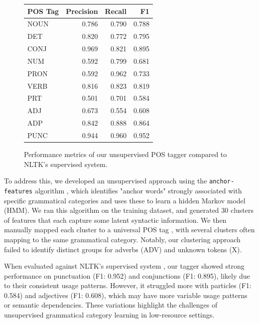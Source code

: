 \begin{figure}
    \centering
    \small
    \begin{tabular}{lrrr}
    \toprule
    POS Tag & Precision & Recall & F1 \\
    \midrule
    NOUN & 0.786 & 0.790 & 0.788 \\
    DET & 0.820 & 0.772 & 0.795 \\
    CONJ & 0.969 & 0.821 & 0.895 \\
    NUM & 0.592 & 0.799 & 0.681 \\
    PRON & 0.592 & 0.962 & 0.733 \\   
    VERB & 0.816 & 0.823 & 0.819 \\
    PRT & 0.501 & 0.701 & 0.584 \\
    ADJ & 0.673 & 0.554 & 0.608 \\
    ADP & 0.842 & 0.888 & 0.864 \\
    PUNC & 0.944 & 0.960 & 0.952 \\
    \bottomrule
    \end{tabular}
    \caption{\label{tbl:unsupervised-pos-performance} Performance metrics of our unsupervised POS tagger compared to NLTK's supervised system.}
\end{figure}

To address this, we developed an unsupervised approach using the \texttt{anchor-features} algorithm \cite{stratos2016unsupervisedpos}, which identifies "anchor words" strongly associated with specific grammatical categories and uses these to learn a hidden Markov model (HMM). We ran this algorithm on the training dataset, and generated 30 clusters of features that each capture some latent syntactic information. We then manually mapped each cluster to a universal POS tag \cite{petrov2012universalpos}, with several clusters often mapping to the same grammatical category. Notably, our clustering approach failed to identify distinct groups for adverbs (ADV) and unknown tokens (X).

When evaluated against NLTK's supervised system \cite{bird2009natural}, our tagger showed strong performance on punctuation (F1: 0.952) and conjunctions (F1: 0.895), likely due to their consistent usage patterns. However, it struggled more with particles (F1: 0.584) and adjectives (F1: 0.608), which may have more variable usage patterns or semantic dependencies. These variations highlight the challenges of unsupervised grammatical category learning in low-resource settings.

